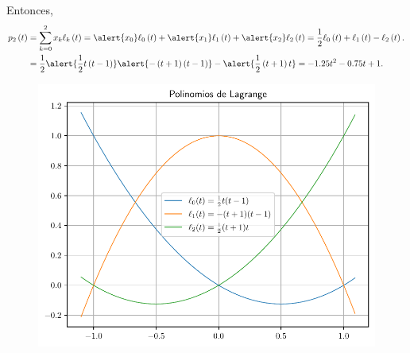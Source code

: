 \begin{frame}
\begin{solution}
		Entonces,
		\begin{align*}
			p_{2}\left(t\right) & =
			\sum\limits_{k=0}^{2}
			x_{k}
			\ell_{k}\left(t\right)=
			\alert{x_{0}}\ell_{0}\left(t\right)+
			\alert{x_{1}}\ell_{1}\left(t\right)+
			\alert{x_{2}}\ell_{2}\left(t\right)=
			\dfrac{1}{2}\ell_{0}\left(t\right)+
			\ell_{1}\left(t\right)-
			\ell_{2}\left(t\right).               \\
			                    & =
			\dfrac{1}{2}\alert{\dfrac{1}{2}t\left(t-1\right)}
			\alert{-\left(t+1\right)\left(t-1\right)}-
			\alert{\dfrac{1}{2}\left(t+1\right)t}=
			-1.25t^{2}-0.75t+1.
		\end{align*}
	\end{solution}
\end{frame}

\begin{frame}
	\begin{solution}
		\begin{figure}[ht!]
			\centering
			\includegraphics[width=.72\paperwidth]{p6_lagrange}
		\end{figure}
	\end{solution}
\end{frame}


